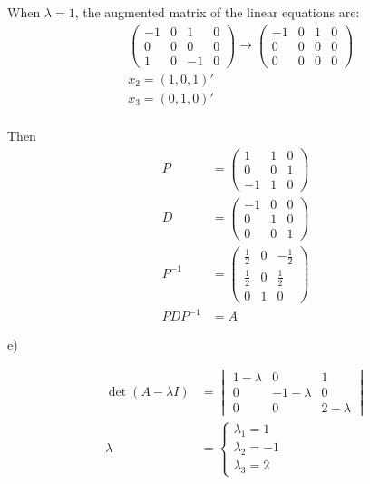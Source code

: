 \documentclass[letterpaper, 11pt]{article}
\newcommand{\1}{\mathds{1}}	%
\theoremstyle{definition}
\begin{document}
When $\lambda = 1$, the augmented matrix of the linear equations are: \begin{align*}
    &\left(\begin{array}{ccc|c}
        -1 & 0 & 1 & 0 \\
        0 & 0 & 0 & 0 \\
        1 & 0 & -1 & 0
    \end{array}\right) \to \left(\begin{array}{ccc|c}
        -1 & 0 & 1 & 0 \\
        0 & 0 & 0 & 0 \\
        0 & 0 & 0 & 0
    \end{array}\right) \\
    &x_{2} = (1,0,1)' \\
    &x_{3} = (0,1,0)' \\
\end{align*}

Then \begin{align*}
    P &= \begin{pmatrix}
        1 & 1 & 0 \\
        0 & 0 & 1 \\
        -1 & 1 & 0
    \end{pmatrix} \\
    D &= \begin{pmatrix}
        -1 & 0 & 0 \\
        0 & 1 & 0 \\
        0 & 0 & 1
    \end{pmatrix} \\
    P ^{-1} &= \begin{pmatrix}
        \frac{1}{2} & 0 & -\frac{1}{2} \\
        \frac{1}{2} & 0 & \frac{1}{2} \\
        0 & 1 & 0
    \end{pmatrix} \\
    PDP ^{-1} &=  A
\end{align*}

e)

\begin{align*}
    \det (A-\lambda I) &= \begin{vmatrix}
        1-\lambda & 0 & 1 \\
        0 & -1-\lambda & 0 \\
        0 & 0 & 2-\lambda
    \end{vmatrix} \\
    \lambda &= \left\{\begin{array}{l}
        \lambda_{1} = 1\\
        \lambda_{2} = -1 \\
        \lambda_{3} = 2 
    \end{array}\right.
\end{align*}
\end{document}
